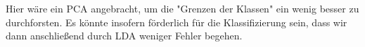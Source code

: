 Hier wäre ein PCA angebracht, um die "Grenzen der Klassen" ein wenig besser zu durchforsten. Es könnte insofern förderlich für die Klassifizierung sein, dass wir dann anschließend durch LDA weniger Fehler begehen.
\begin{center}
	\\
\end{center}

